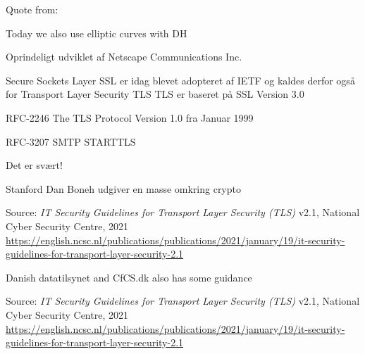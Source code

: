 \documentclass[Screen16to9,17pt]{foils}
\begin{document}
\begin{list2}
\item Quote from: {\small {}}
\item Today we also use elliptic curves with DH \\{\small {}}
\end{list2}




\begin{list1}
\item Oprindeligt udviklet af Netscape Communications Inc.
\item Secure Sockets Layer SSL er idag blevet adopteret af IETF og kaldes
derfor også for Transport Layer Security TLS
TLS er baseret på SSL Version 3.0
\item RFC-2246 The TLS Protocol Version 1.0 fra Januar 1999
\item RFC-3207 SMTP STARTTLS
\item Det er svært!
\item Stanford Dan Boneh udgiver en masse omkring crypto\\ 
\end{list1}



Source: \emph{IT Security Guidelines for
Transport Layer Security (TLS)} v2.1, National Cyber Security Centre, 2021\\{\scriptsize
\url{https://english.ncsc.nl/publications/publications/2021/january/19/it-security-guidelines-for-transport-layer-security-2.1}}

\begin{list2}
\item Danish datatilsynet and CfCS.dk also has some guidance
\end{list2}



Source: \emph{IT Security Guidelines for
Transport Layer Security (TLS)} v2.1, National Cyber Security Centre, 2021\\{\scriptsize
\url{https://english.ncsc.nl/publications/publications/2021/january/19/it-security-guidelines-for-transport-layer-security-2.1}}
\end{document}
